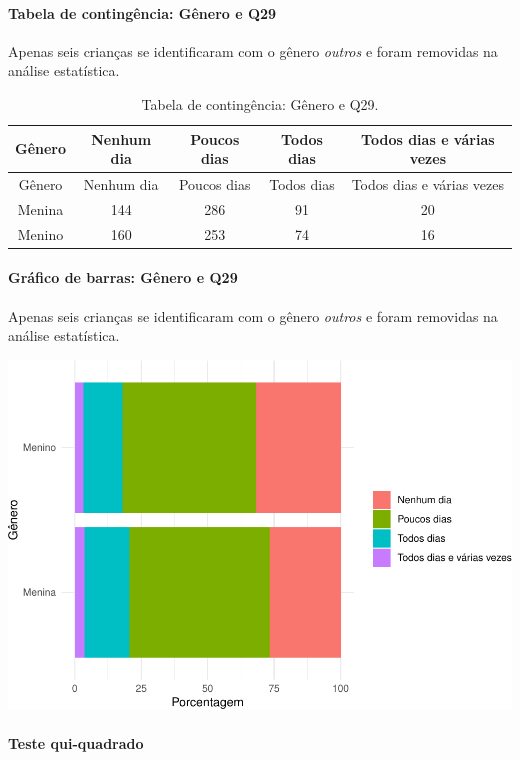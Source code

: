 \documentclass[]{article}
\let\oldparagraph\paragraph
\renewcommand{\paragraph}[1]{\oldparagraph{#1}\mbox{}}
\begin{document}
\cleardoublepage

\hypertarget{tabela-de-continguxeancia-guxeanero-e-q29}{%
\paragraph{Tabela de contingência: Gênero e Q29}\label{tabela-de-continguxeancia-guxeanero-e-q29}}

Apenas seis crianças se identificaram com o gênero \emph{outros} e foram removidas na análise estatística.

\begin{longtable}[]{@{}ccccc@{}}
\caption{\label{tab:unnamed-chunk-908}Tabela de contingência: Gênero e Q29.}\tabularnewline
\toprule
Gênero & Nenhum dia & Poucos dias & Todos dias & Todos dias e várias vezes\tabularnewline
\midrule
\endfirsthead
\toprule
Gênero & Nenhum dia & Poucos dias & Todos dias & Todos dias e várias vezes\tabularnewline
\midrule
\endhead
Menina & 144 & 286 & 91 & 20\tabularnewline
Menino & 160 & 253 & 74 & 16\tabularnewline
\bottomrule
\end{longtable}

\hypertarget{gruxe1fico-de-barras-guxeanero-e-q29}{%
\paragraph{Gráfico de barras: Gênero e Q29}\label{gruxe1fico-de-barras-guxeanero-e-q29}}

Apenas seis crianças se identificaram com o gênero \emph{outros} e foram removidas na análise estatística.

\begin{center}\includegraphics[width=0.75\linewidth]{relatorio_covid19_files/figure-latex/unnamed-chunk-909-1} \end{center}

\hypertarget{teste-qui-quadrado-78}{%
\paragraph{Teste qui-quadrado}\label{teste-qui-quadrado-78}}
\end{document}
